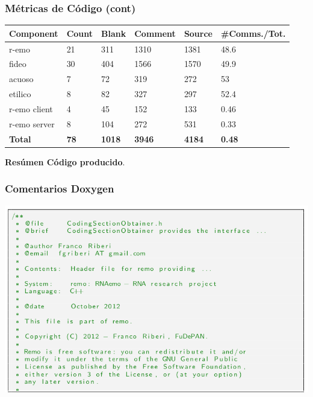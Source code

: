   \begin{frame}\frametitle{\textbf{Métricas de Código (cont)}}    
    \begin{table}[!htf]
      \begin{tabular}{|l|l|l|l|l|l|}
      \hline
      \textbf{Component} & \textbf{Count} & \textbf{Blank} & \textbf{Comment} & \textbf{Source} & \small{\textbf{\#Comms./Tot.}}\\
      \hline
      r-emo           & 21 & 311  & 1310  & 1381 & 48.6 \\ \hline
      fideo           & 30 & 404  & 1566  & 1570 & 49.9 \\ \hline
      acuoso          & 7  & 72   & 319   & 272  & 53   \\ \hline
      etilico         & 8  & 82   & 327   & 297  & 52.4 \\ \hline
      r-emo client    & 4  & 45   & 152   & 133  & 0.46 \\ \hline
      r-emo server    & 8  & 104  & 272   & 531  & 0.33 \\ \hline
      \textbf{Total}  & \textbf{78} & \textbf{1018} & \textbf{3946}  & \textbf{4184} & \textbf{0.48} \\ \hline
      \end{tabular}
      \end{table}
      \hspace*{3.5cm}\textbf{Resúmen Código producido}.
  \end{frame} 

  \begin{frame}
    \frametitle{\textbf{Comentarios Doxygen}}    
    \hspace*{.6cm}\includegraphics[scale=.35]{images/doxygen.png}
  \end{frame}   